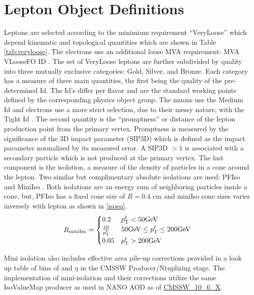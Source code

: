 \section{Lepton Object Definitions}


Leptons are selected according to the minimium requirement ``VeryLoose'' which depend kinematic and topological quantities which are shown in Table \ref{tab:veryloose}. The electrons use an additional loose MVA requirement: MVA VLooseFO ID \cite{elecMVA}. The set of VeryLoose leptons are further subdivided by quality into three mutually exclusive categories: Gold, Silver, and Bronze. Each category has a measure of three main quantities, the first being the quality of the pre-determined Id. The Id's differ per flavor and are the standard working points defined by the corresponding physics object group. The muons use the Medium Id \cite{muMediumId} and electrons use a more strict selection, due to their messy nature, with the Tight Id \cite{eTightID}. The second quantity is the ``promptness'' or distance of the lepton production point from the primary vertex. Promptness is measured by the significance of the 3D impact parameter (SIP3D) which is defined as the impact parameter normalized by its measured error. A SIP3D $> 1$ is associated with a secondary particle which is not produced at the primary vertex. The last component is the  isolation, a measure of the density of particles in a cone around the lepton. Two similar but complimentary absolute isolations are used: PFIso \cite{murun2baseline} and MiniIso \cite{miniIso}. Both isolations are an energy sum of neighboring particles inside a cone, but, PFIso has a fixed cone size of $R=0.4$ cm  and miniIso cone sizes varies inversely with lepton \pt as shown in \ref{isoeq}.
\begin{equation}
R_{\text{miniIso}}=
    \begin{cases}
      0.2 & p_{\mathrm{T}}^\ell < 50 \text{GeV}\\
      \frac{10}{p_{\mathrm{T}}^\ell} & 50 \text{GeV} \leq p_{\mathrm{T}}^\ell \leq 200 \text{GeV} \\
      0.05 & p_{\mathrm{T}}^\ell > 200 \text{GeV}
    \end{cases}
    \label{isoeq}
\end{equation}

Mini isolation also includes effective area pile-up corrections provided in a look up table of bins of \pt and $\eta$ in the CMSSW Producer/Ntuplizing stage. The implementation of mini-isolation and their corrections utilize the same IsoValueMap producer as used in NANO AOD as of \url{CMSSW_10_6_X}.


